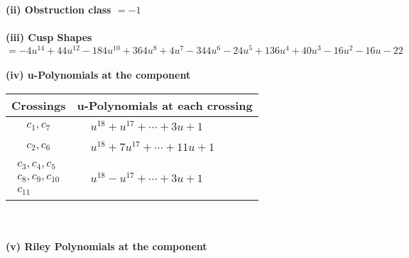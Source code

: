 \documentclass[1p]{elsarticle_modified}
\theoremstyle{definition}
\begin{document}
\flushleft \textbf{(ii) Obstruction class $= -1$}\\~\\
\flushleft \textbf{(iii) Cusp Shapes $= -4 u^{14}+44 u^{12}-184 u^{10}+364 u^8+4 u^7-344 u^6-24 u^5+136 u^4+40 u^3-16 u^2-16 u-22$}\\~\\
\newpage\renewcommand{\arraystretch}{1}
\flushleft \textbf{(iv) u-Polynomials at the component}\newline \\
\begin{tabular}{m{50pt}|m{274pt}}
Crossings & \hspace{64pt}u-Polynomials at each crossing \\
\hline $$\begin{aligned}c_{1},c_{7}\end{aligned}$$&$\begin{aligned}
&u^{18}+u^{17}+\cdots+3 u+1
\end{aligned}$\\
\hline $$\begin{aligned}c_{2},c_{6}\end{aligned}$$&$\begin{aligned}
&u^{18}+7 u^{17}+\cdots+11 u+1
\end{aligned}$\\
\hline $$\begin{aligned}c_{3},c_{4},c_{5}\\c_{8},c_{9},c_{10}\\c_{11}\end{aligned}$$&$\begin{aligned}
&u^{18}- u^{17}+\cdots+3 u+1
\end{aligned}$\\
\hline
\end{tabular}\\~\\
\newpage\renewcommand{\arraystretch}{1}
\flushleft \textbf{(v) Riley Polynomials at the component}\newline \\
\end{document}
